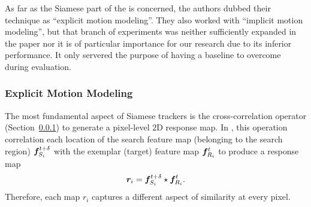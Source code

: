 As far as the Siamese part of the \siammot{} is concerned, the authors dubbed their technique as ``explicit motion modeling''. They also worked with ``implicit motion modeling'', but that branch of experiments was neither sufficiently expanded in the paper nor it is of particular importance for our research due to its inferior performance. It only servered the purpose of having a baseline to overcome during evaluation.

\subsubsection{Explicit Motion Modeling}

The most fundamental aspect of Siamese trackers is the cross-correlation operator (Section~\ref{}) to generate a pixel-level $2$D response map. In \siammot{}, this operation correlation each location of the search feature map (belonging to the search region) $\bm{f}_{S_i}^{t + \delta}$ with the exemplar (target) feature map $\bm{f}_{R_i}^{t}$ to produce a response map
\begin{equation}
    \bm{r}_{i} = \bm{f}_{S_i}^{t + \delta} \star \bm{f}_{R_i}^{t}.
\end{equation}
Therefore, each map $r_i$ captures a different aspect of similarity at every pixel.

